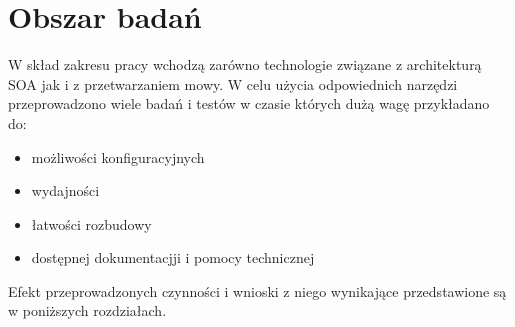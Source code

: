 \section{Obszar badań} %
W skład zakresu pracy wchodzą zarówno technologie związane z architekturą SOA jak i z przetwarzaniem mowy. W celu użycia odpowiednich narzędzi przeprowadzono wiele badań i testów w czasie których dużą wagę przykładano do:
\begin{itemize}
 	\item możliwości konfiguracyjnych
	\item wydajności
	\item łatwości rozbudowy
	\item dostępnej dokumentacjji i pomocy technicznej
\end{itemize}
Efekt przeprowadzonych czynności i wnioski z niego wynikające przedstawione są w poniższych rozdziałach.


